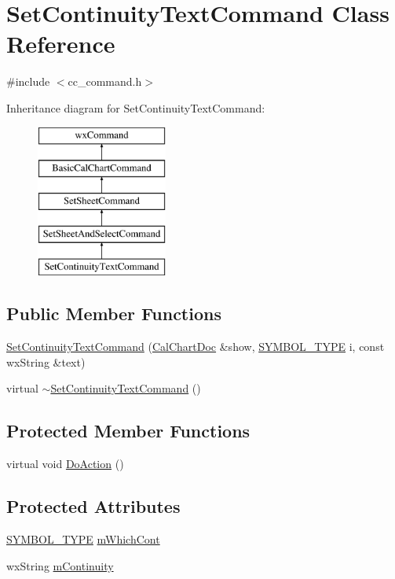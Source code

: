 \hypertarget{a00124}{\section{Set\-Continuity\-Text\-Command Class Reference}
\label{a00124}
}


{\ttfamily \#include $<$cc\-\_\-command.\-h$>$}

Inheritance diagram for Set\-Continuity\-Text\-Command\-:\begin{figure}[H]
\begin{center}
\leavevmode
\includegraphics[height=5.000000cm]{a00124}
\end{center}
\end{figure}
\subsection*{Public Member Functions}
\begin{DoxyCompactItemize}
\item 
\hyperlink{a00124_af1242e89e3a71aab81c8436789932577}{Set\-Continuity\-Text\-Command} (\hyperlink{a00020}{Cal\-Chart\-Doc} \&show, \hyperlink{a00216_a68cd84e0300be6f9ff4474682762c9ee}{S\-Y\-M\-B\-O\-L\-\_\-\-T\-Y\-P\-E} i, const wx\-String \&text)
\item 
virtual \hyperlink{a00124_a0aca8badcac22e978696972a94394c17}{$\sim$\-Set\-Continuity\-Text\-Command} ()
\end{DoxyCompactItemize}
\subsection*{Protected Member Functions}
\begin{DoxyCompactItemize}
\item 
virtual void \hyperlink{a00124_a8545ed7f5c3ca572042c4a0abc8c2491}{Do\-Action} ()
\end{DoxyCompactItemize}
\subsection*{Protected Attributes}
\begin{DoxyCompactItemize}
\item 
\hyperlink{a00216_a68cd84e0300be6f9ff4474682762c9ee}{S\-Y\-M\-B\-O\-L\-\_\-\-T\-Y\-P\-E} \hyperlink{a00124_af7d76e985b20142b77f724ed3619a6ac}{m\-Which\-Cont}
\item 
wx\-String \hyperlink{a00124_aa487d13de203c5a946bf4dbf4b3d7d11}{m\-Continuity}
\end{DoxyCompactItemize}


